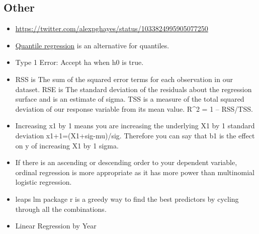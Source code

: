 \documentclass[]{book}
\newenvironment{Shaded}{\begin{snugshade}}{\end{snugshade}}
\newcommand{\KeywordTok}[1]{\textcolor[rgb]{0.13,0.29,0.53}{\textbf{#1}}}
\newcommand{\DataTypeTok}[1]{\textcolor[rgb]{0.13,0.29,0.53}{#1}}
\newcommand{\StringTok}[1]{\textcolor[rgb]{0.31,0.60,0.02}{#1}}
\newcommand{\OperatorTok}[1]{\textcolor[rgb]{0.81,0.36,0.00}{\textbf{#1}}}
\newcommand{\NormalTok}[1]{#1}
\theoremstyle{definition}
\theoremstyle{definition}
\theoremstyle{definition}
\theoremstyle{remark}
\begin{document}
\subsection{Other}\label{other-2}

\begin{itemize}
\item
  \url{https://twitter.com/alexpghayes/status/1033824995905077250}
\item
  \href{https://en.wikipedia.org/wiki/Quantile_regression}{Quantile
  regression} is an alternative for quantiles.
\item
  Type 1 Error: Accept ha when h0 is true.
\item
  RSS is The sum of the squared error terms for each observation in our
  dataset. RSE is The standard deviation of the residuals about the
  regression surface and is an estimate of sigma. TSS is a measure of
  the total squared deviation of our response variable from its mean
  value. R\^{}2 = 1 -- RSS/TSS.
\item
  Increasing x1 by 1 means you are increasing the underlying X1 by 1
  standard deviation x1+1=(X1+sig-mu)/sig. Therefore you can say that b1
  is the effect on y of increasing X1 by 1 sigma.
\item
  If there is an ascending or descending order to your dependent
  variable, ordinal regression is more appropriate as it has more power
  than multinomial logistic regression.
\item
  leaps lm package r is a greedy way to find the best predictors by
  cycling through all the combinations.
\item
  Linear Regression by Year
\end{itemize}

\begin{Shaded}
\end{Shaded}
\end{document}
